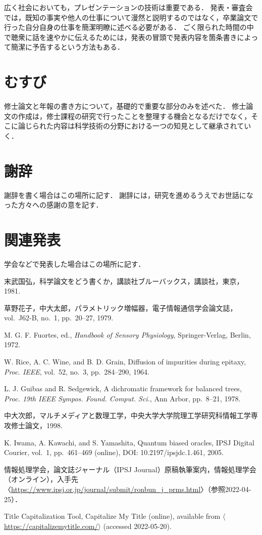 \documentclass[10pt,a4paper,notitlepage,oneside,twocolumn]{abst_jsarticle}
\begin{document}
広く社会においても，プレゼンテーションの技術は重要である．
発表・審査会では，既知の事実や他人の仕事について漫然と説明するのではなく，卒業論文で行った自分自身の仕事を簡潔明瞭に述べる必要がある．
ごく限られた時間の中で聴衆に話を速やかに伝えるためには，発表の冒頭で発表内容を箇条書きによって簡潔に予告するという方法もある．


\section{むすび}
修士論文と年報の書き方について，基礎的で重要な部分のみを述べた．
修士論文の作成は，修士課程の研究で行ったことを整理する機会となるだけでなく，そこに論じられた内容は科学技術の分野における一つの知見として継承されていく．



\section*{謝辞}

謝辞を書く場合はこの場所に記す．
謝辞には，研究を進めるうえでお世話になった方々への感謝の意を記す．


\section*{関連発表}

学会などで発表した場合はこの場所に記す．


\begin{thebibliography}{99}

末武国弘，科学論文をどう書くか，講談社ブルーバックス，講談社，東京，1981. 

草野花子，中大太郎，パラメトリック増幅器，電子情報通信学会論文誌，vol.~J62-B, no.~1, pp.~20--27, 1979. 

M. G. F. Fuortes, ed., \textit{Handbook of Sensory Physiology}, Springer-Verlag, Berlin, 1972.

W. Rice, A. C. Wine, and B. D. Grain, Diffusion of impurities during epitaxy, \textit{Proc. IEEE}, vol.~52, no.~3, pp.~284--290, 1964.

L. J. Guibas and R. Sedgewick, A dichromatic framework for balanced trees, 
\textit{Proc. 19th IEEE Sympos. Found. Comput. Sci.}, Ann Arbor, pp.~8--21, 1978.

中大次郎，マルチメディアと数理工学，中央大学大学院理工学研究科情報工学専攻修士論文，1998.

K. Iwama, A. Kawachi, and S. Yamashita, Quantum biased oracles, IPSJ Digital Courier, vol.~1, pp.~461--469 (online), DOI: 10.2197/ipsjdc.1.461, 2005.

情報処理学会，論文誌ジャーナル（IPSJ Journal）原稿執筆案内，情報処理学会（オンライン），入手先〈\url{https://www.ipsj.or.jp/journal/submit/ronbun_j_prms.html}〉（参照2022-04-25）．

Title Capitalization Tool, Capitalize My Title (online), available from $\langle$\url{https://capitalizemytitle.com/}$\rangle$ (accessed 2022-05-20). 


\end{thebibliography}
\end{document}
